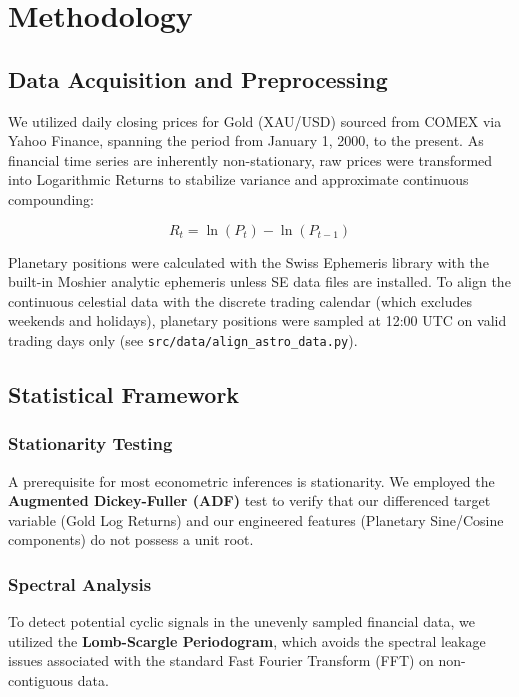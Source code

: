 \documentclass[
  american,
  11pt,
  a4paper,
  oneside,
  openany]{article}
\begin{document}
\section{Methodology}\label{methodology}

\subsection{Data Acquisition and
Preprocessing}\label{data-acquisition-and-preprocessing}

We utilized daily closing prices for Gold (XAU/USD) sourced from COMEX
via Yahoo Finance, spanning the period from January 1, 2000, to the
present. As financial time series are inherently non-stationary, raw
prices were transformed into Logarithmic Returns to stabilize variance
and approximate continuous compounding:

\[ R_t = \ln(P_t) - \ln(P_{t-1}) \]

Planetary positions were calculated with the Swiss Ephemeris library
with the built-in Moshier analytic ephemeris unless SE data files are
installed. To align the continuous celestial data with the discrete
trading calendar (which excludes weekends and holidays), planetary
positions were sampled at 12:00 UTC on valid trading days only (see
\texttt{src/data/align\_astro\_data.py}).

\subsection{Statistical Framework}\label{statistical-framework}

\subsubsection{Stationarity Testing}\label{stationarity-testing}

A prerequisite for most econometric inferences is stationarity. We
employed the \textbf{Augmented Dickey-Fuller (ADF)} test to verify that
our differenced target variable (Gold Log Returns) and our engineered
features (Planetary Sine/Cosine components) do not possess a unit root.

\subsubsection{Spectral Analysis}\label{spectral-analysis}

To detect potential cyclic signals in the unevenly sampled financial
data, we utilized the \textbf{Lomb-Scargle Periodogram}, which avoids
the spectral leakage issues associated with the standard Fast Fourier
Transform (FFT) on non-contiguous data.
\end{document}
